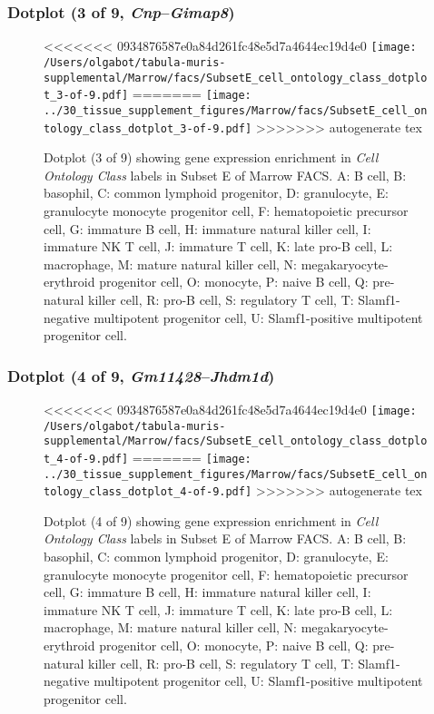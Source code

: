 \clearpage

\subsubsection{Dotplot (3 of 9, \emph{Cnp}--\emph{Gimap8})}
\begin{figure}[h]
\centering
<<<<<<< 0934876587e0a84d261fc48e5d7a4644ec19d4e0
\texttt{[image: /Users/olgabot/tabula-muris-supplemental/Marrow/facs/SubsetE\_cell\_ontology\_class\_dotplot\_3-of-9.pdf]}
=======
\texttt{[image: ../30\_tissue\_supplement\_figures/Marrow/facs/SubsetE\_cell\_ontology\_class\_dotplot\_3-of-9.pdf]}
>>>>>>> autogenerate tex

\caption{ Dotplot (3 of 9)  showing gene expression enrichment in \emph{Cell Ontology Class} labels in Subset E of Marrow FACS. A: B cell, B: basophil, C: common lymphoid progenitor, D: granulocyte, E: granulocyte monocyte progenitor cell, F: hematopoietic precursor cell, G: immature B cell, H: immature natural killer cell, I: immature NK T cell, J: immature T cell, K: late pro-B cell, L: macrophage, M: mature natural killer cell, N: megakaryocyte-erythroid progenitor cell, O: monocyte, P: naive B cell, Q: pre-natural killer cell, R: pro-B cell, S: regulatory T cell, T: Slamf1-negative multipotent progenitor cell, U: Slamf1-positive multipotent progenitor cell.}
\end{figure}


\clearpage

\subsubsection{Dotplot (4 of 9, \emph{Gm11428}--\emph{Jhdm1d})}
\begin{figure}[h]
\centering
<<<<<<< 0934876587e0a84d261fc48e5d7a4644ec19d4e0
\texttt{[image: /Users/olgabot/tabula-muris-supplemental/Marrow/facs/SubsetE\_cell\_ontology\_class\_dotplot\_4-of-9.pdf]}
=======
\texttt{[image: ../30\_tissue\_supplement\_figures/Marrow/facs/SubsetE\_cell\_ontology\_class\_dotplot\_4-of-9.pdf]}
>>>>>>> autogenerate tex

\caption{ Dotplot (4 of 9)  showing gene expression enrichment in \emph{Cell Ontology Class} labels in Subset E of Marrow FACS. A: B cell, B: basophil, C: common lymphoid progenitor, D: granulocyte, E: granulocyte monocyte progenitor cell, F: hematopoietic precursor cell, G: immature B cell, H: immature natural killer cell, I: immature NK T cell, J: immature T cell, K: late pro-B cell, L: macrophage, M: mature natural killer cell, N: megakaryocyte-erythroid progenitor cell, O: monocyte, P: naive B cell, Q: pre-natural killer cell, R: pro-B cell, S: regulatory T cell, T: Slamf1-negative multipotent progenitor cell, U: Slamf1-positive multipotent progenitor cell.}
\end{figure}


